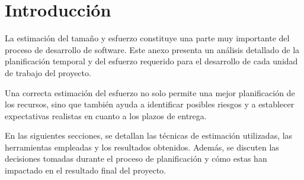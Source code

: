 \chapter{Introducción}
\label{anexo3:cap:introduccion}
La estimación del tamaño y esfuerzo constituye una parte muy importante del proceso de desarrollo
de software. Este anexo presenta un análisis detallado de la planificación temporal y del esfuerzo
requerido para el desarrollo de cada unidad de trabajo del proyecto.

Una correcta estimación del esfuerzo no solo permite una mejor planificación de los recursos, sino
que también ayuda a identificar posibles riesgos y a establecer expectativas realistas en cuanto a
los plazos de entrega.

En las siguientes secciones, se detallan las técnicas de estimación utilizadas, las herramientas
empleadas y los resultados obtenidos. Además, se discuten las decisiones tomadas durante el proceso
de planificación y cómo estas han impactado en el resultado final del proyecto.

